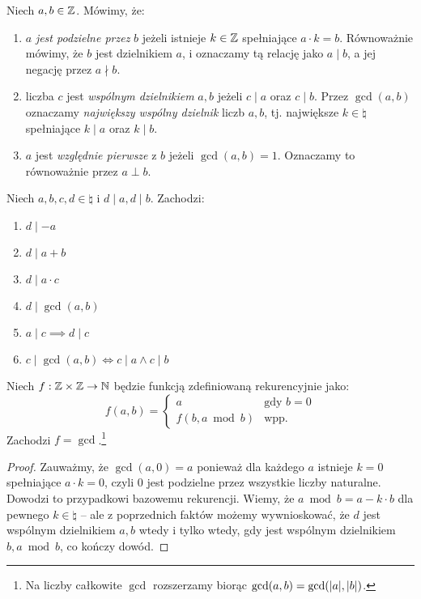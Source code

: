
\begin{definition}[Notacja]
	Niech $a, b \in \mathbb{Z}$. Mówimy, że:
	\begin{enumerate}
		\item $a$ \textit{jest podzielne przez} $b$ jeżeli istnieje $k \in \mathbb{Z}$
		      spełniające $a \cdot k = b$. Równoważnie mówimy, że $b$ jest dzielnikiem $a$,
		      i oznaczamy tą relację jako $a \mid b$, a jej negację przez $a \nmid b$.
		\item liczba $c$ jest \textit{wspólnym dzielnikiem} $a, b$ jeżeli $c \mid a$ oraz $c \mid b$.
		      Przez $\gcd(a, b)$ oznaczamy \textit{największy wspólny dzielnik} liczb $a, b$, tj. największe
		      $k \in \natural$ spełniające $k \mid a$ oraz $k \mid b$.
		\item $a$ jest \textit{względnie pierwsze} z $b$ jeżeli $\gcd(a, b) = 1$.
		      Oznaczamy to równoważnie przez $a \perp b$.
	\end{enumerate}
\end{definition}

\begin{fact}
	Niech $a, b, c, d \in \natural$ i $d \mid a, d \mid b$. Zachodzi:
	\begin{enumerate}
		\item $d \mid -a$
		\item $d \mid a+b$
		\item $d \mid a\cdot c$
		\item $d \mid \gcd(a, b)$
		\item $a \mid c \implies d \mid c$
		\item $c \mid \gcd(a, b) \iff c \mid a \land c \mid b$
	\end{enumerate}
\end{fact}

\begin{theorem}
	\label{nt:euklides}
	Niech $f: \mathbb{Z} \times \mathbb{Z} \to \mathbb{N}$ będzie funkcją zdefiniowaną rekurencyjnie jako:
	\begin{equation*}
		f(a, b) = \begin{cases}
			a                & \text{gdy } b = 0 \\
			f(b, a \bmod{b}) & \text{wpp.}
		\end{cases}
	\end{equation*}
	Zachodzi $f = \gcd$.\footnote{Na liczby całkowite $\gcd$ rozszerzamy biorąc $\gcd(a, b) = \gcd(\abs{a}, \abs{b})$.}
\end{theorem}
\begin{proof}
	Zauważmy, że $\gcd(a, 0) = a$ ponieważ dla każdego $a$ istnieje $k = 0$ spełniające $a \cdot k = 0$, czyli $0$ jest podzielne przez wszystkie liczby naturalne.
	Dowodzi to przypadkowi bazowemu rekurencji.
	Wiemy, że $a \bmod b = a - k \cdot b$ dla pewnego $k \in \natural$ -- ale
	z poprzednich faktów możemy wywnioskować, że $d$ jest wspólnym dzielnikiem $a, b$
	wtedy i tylko wtedy, gdy jest wspólnym dzielnikiem $b, a \bmod b$, co kończy dowód.
\end{proof}

